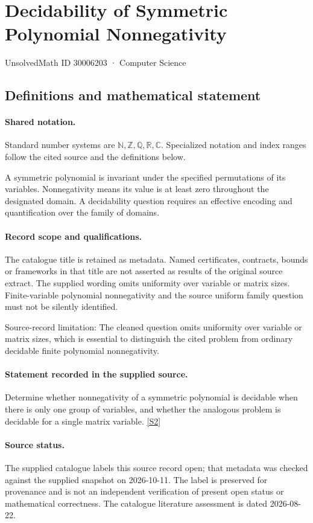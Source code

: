 \documentclass[11pt]{article}
\newcommand{\sref}[2]{\hyperlink{source:#1:#2}{[S#2]}}
\begin{document}
\setcounter{section}{30006202}
\section{Decidability of Symmetric Polynomial Nonnegativity}\label{30006203}
{\small\sffamily UnsolvedMath ID 30006203 · Computer Science}
\subsection{Definitions and mathematical statement}

\paragraph{Shared notation.}Standard number systems are $\mathbb N,\mathbb Z,\mathbb Q,\mathbb R,\mathbb C$. Specialized notation and index ranges follow the cited source and the definitions below.


A symmetric polynomial is invariant under the specified permutations of its variables. Nonnegativity means its value is at least zero throughout the designated domain. A decidability question requires an effective encoding and quantification over the family of domains.
\paragraph{Record scope and qualifications.}
The catalogue title is retained as metadata. Named certificates, contracts, bounds or frameworks in that title are not asserted as results of the original source extract.
The supplied wording omits uniformity over variable or matrix sizes. Finite-variable polynomial nonnegativity and the source uniform family question must not be silently identified.

Source-record limitation: The cleaned question omits uniformity over variable or matrix sizes, which is essential to distinguish the cited problem from ordinary decidable finite polynomial nonnegativity.
\paragraph{Statement recorded in the supplied source.}
Determine whether nonnegativity of a symmetric polynomial is decidable when there is only one group of variables, and whether the analogous problem is decidable for a single matrix variable. \sref{30006203}{2}
\paragraph{Source status.}
The supplied catalogue labels this source record open; that metadata was checked against the supplied snapshot on 2026-10-11. The label is preserved for provenance and is not an independent verification of present open status or mathematical correctness. The catalogue literature assessment is dated 2026-08-22.
\end{document}
